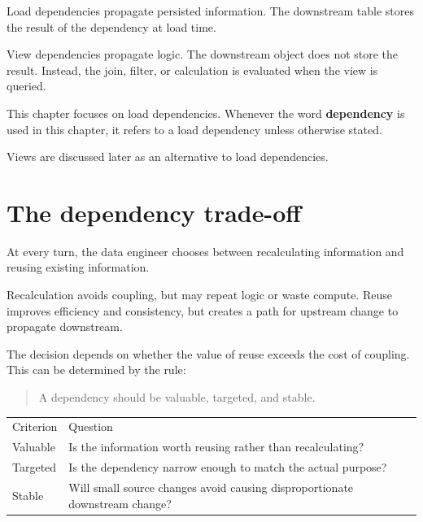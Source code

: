 \documentclass[10pt,openany,10pt]{book}
\newcounter{none}
\let\podeToprule\toprule
\let\podeMidrule\midrule
\let\podeBottomrule\bottomrule
\renewcommand{\toprule}{\arrayrulecolor{pbiGrid}\podeToprule}
\renewcommand{\midrule}{\arrayrulecolor{pbiGrid}\podeMidrule}
\renewcommand{\bottomrule}{\arrayrulecolor{pbiGrid}\podeBottomrule}
\begin{document}
Load dependencies propagate persisted information. The downstream table
stores the result of the dependency at load time.

View dependencies propagate logic. The downstream object does not store
the result. Instead, the join, filter, or calculation is evaluated when
the view is queried.

This chapter focuses on load dependencies. Whenever the word
\textbf{dependency} is used in this chapter, it refers to a load
dependency unless otherwise stated.

Views are discussed later as an alternative to load dependencies.

\section{The dependency trade-off}\label{the-dependency-trade-off}

At every turn, the data engineer chooses between recalculating
information and reusing existing information.

Recalculation avoids coupling, but may repeat logic or waste compute.
Reuse improves efficiency and consistency, but creates a path for
upstream change to propagate downstream.

The decision depends on whether the value of reuse exceeds the cost of
coupling. This can be determined by the rule:

\begin{quote}
A dependency should be valuable, targeted, and stable.
\end{quote}

{\def\LTcaptype{none} %
\begin{longtable}[]{@{}
  >{\raggedright\arraybackslash}p{}
  >{\raggedright\arraybackslash}p{}@{}}
\toprule\noalign{}
\begin{minipage}[b]{\linewidth}\raggedright
Criterion
\end{minipage} & \begin{minipage}[b]{\linewidth}\raggedright
Question
\end{minipage} \\
\midrule\noalign{}
\endhead
\bottomrule\noalign{}
\endlastfoot
Valuable & Is the information worth reusing rather than
recalculating? \\
Targeted & Is the dependency narrow enough to match the actual
purpose? \\
Stable & Will small source changes avoid causing disproportionate
downstream change? \\
\end{longtable}
}
\end{document}
